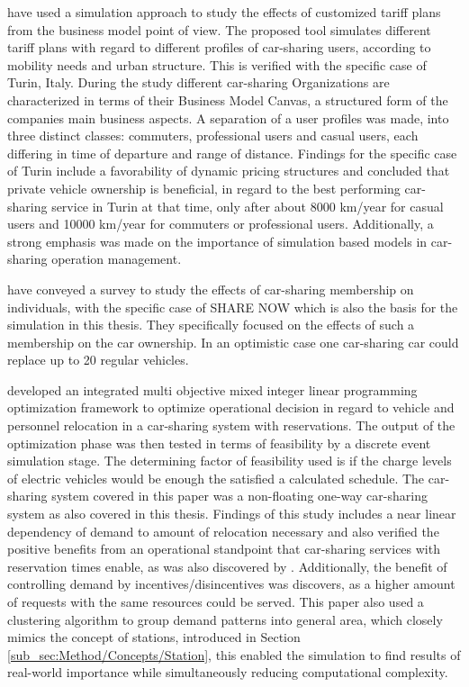  have used a simulation approach to study the effects of customized
tariff plans from the business model point of view. The proposed tool simulates different tariff plans
with regard to different profiles of car-sharing users, according to mobility needs and urban structure.
This is verified with the specific case of Turin, Italy. During the study different car-sharing Organizations
are characterized in terms of their Business Model Canvas, a structured form of the companies main business
aspects. A separation of a user profiles was made, into three distinct classes: commuters, professional users
and casual users, each differing in time of departure and range of distance. Findings for the specific
case of Turin include a favorability of dynamic pricing structures and concluded that private vehicle ownership
is beneficial, in regard to the best performing car-sharing service in Turin at that time, only after about 8000 km/year
for casual users and 10000 km/year for commuters or professional users. Additionally, a strong emphasis was 
made on the importance of simulation based models in car-sharing operation management.

 have conveyed a survey to study the effects of car-sharing
membership on individuals, with the specific case of SHARE NOW which is also the basis
for the simulation in this thesis. They specifically focused on the effects of such a 
membership on the car ownership. In an optimistic case one car-sharing car could replace
up to 20 regular vehicles. 

 developed an integrated multi objective mixed integer
linear programming optimization framework to optimize operational decision in regard to
vehicle and personnel relocation in a car-sharing system with reservations. The output of 
the optimization phase was then tested in terms of feasibility by a discrete event simulation
stage. The determining factor of feasibility used is if the charge levels of electric vehicles
would be enough the satisfied a calculated schedule. The car-sharing system covered in this paper
was a non-floating one-way car-sharing system as also covered in this thesis. Findings of this
study includes a near linear dependency of demand to amount of relocation necessary and also
verified the positive benefits from an operational standpoint that car-sharing services with reservation
times enable, as was also discovered by . Additionally, the benefit of controlling
demand by incentives/disincentives was discovers, as a higher amount of requests with the same 
resources could be served. This paper also used a clustering algorithm to group demand patterns into
general area, which closely mimics the concept of stations, introduced in Section \ref{sub_sec:Method/Concepts/Station},
this enabled the simulation to find results of real-world importance while simultaneously reducing
computational complexity.

